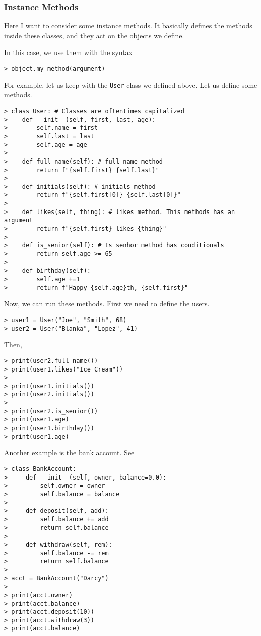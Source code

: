 \subsubsection{Instance Methods}

Here I want to consider some instance methods. It basically defines the methods inside these classes, and they act on the objects we define. 

In this case, we use them with the syntax
\begin{verbatim}
> object.my_method(argument)
\end{verbatim}

For example, let us keep with the \verb|User| class we defined above. Let us define some methods. 
\begin{verbatim}
> class User: # Classes are oftentimes capitalized
>    def __init__(self, first, last, age):
>        self.name = first
>        self.last = last
>        self.age = age
>
>    def full_name(self): # full_name method
>        return f"{self.first} {self.last}"
>
>    def initials(self): # initials method
>        return f"{self.first[0]} {self.last[0]}"
>
>    def likes(self, thing): # likes method. This methods has an argument
>        return f"{self.first} likes {thing}"
>
>    def is_senior(self): # Is senhor method has conditionals
>        return self.age >= 65    
>
>    def birthday(self):
>        self.age +=1
>        return f"Happy {self.age}th, {self.first}"
\end{verbatim}

Now, we can run these methods. First we need to define the users. 
\begin{verbatim}
> user1 = User("Joe", "Smith", 68)        
> user2 = User("Blanka", "Lopez", 41)
\end{verbatim}
Then, 
\begin{verbatim}
> print(user2.full_name())
> print(user1.likes("Ice Cream"))
>
> print(user1.initials())
> print(user2.initials())
>
> print(user2.is_senior())
> print(user1.age)
> print(user1.birthday())
> print(user1.age)	
\end{verbatim}

Another example is the bank account. See
\begin{verbatim}
> class BankAccount:
>     def __init__(self, owner, balance=0.0):
>         self.owner = owner
>         self.balance = balance
> 	
>     def deposit(self, add):
>         self.balance += add
>         return self.balance 
>
>     def withdraw(self, rem):
>         self.balance -= rem
>         return self.balance
> 
> acct = BankAccount("Darcy")
> 
> print(acct.owner)
> print(acct.balance)
> print(acct.deposit(10))
> print(acct.withdraw(3))
> print(acct.balance)	
\end{verbatim}



